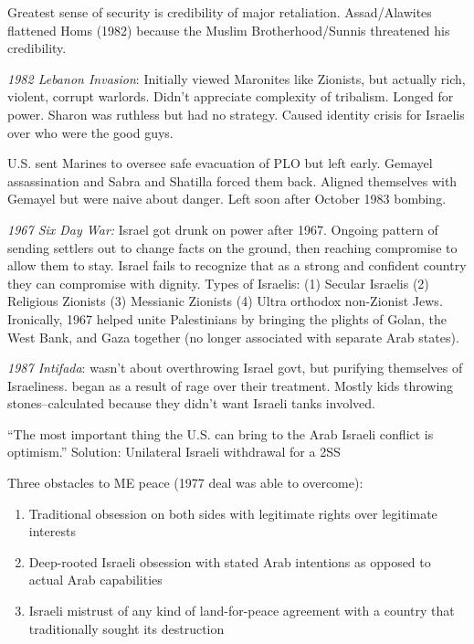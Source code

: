 \documentclass[
]{article}
\begin{document}
Greatest sense of security is credibility of major retaliation.
Assad/Alawites flattened Homs (1982) because the Muslim
Brotherhood/Sunnis threatened his credibility.

\emph{1982 Lebanon Invasion}: Initially viewed Maronites like Zionists,
but actually rich, violent, corrupt warlords. Didn't appreciate
complexity of tribalism. Longed for power. Sharon was ruthless but had
no strategy. Caused identity crisis for Israelis over who were the good
guys.

U.S. sent Marines to oversee safe evacuation of PLO but left early.
Gemayel assassination and Sabra and Shatilla forced them back. Aligned
themselves with Gemayel but were naive about danger. Left soon after
October 1983 bombing.

\emph{1967 Six Day War:} Israel got drunk on power after 1967. Ongoing
pattern of sending settlers out to change facts on the ground, then
reaching compromise to allow them to stay. Israel fails to recognize
that as a strong and confident country they can compromise with dignity.
Types of Israelis: (1) Secular Israelis (2) Religious Zionists (3)
Messianic Zionists (4) Ultra orthodox non-Zionist Jews. Ironically, 1967
helped unite Palestinians by bringing the plights of Golan, the West
Bank, and Gaza together (no longer associated with separate Arab
states).

\emph{1987 Intifada}: wasn't about overthrowing Israel govt, but
purifying themselves of Israeliness. began as a result of rage over
their treatment. Mostly kids throwing stones--calculated because they
didn't want Israeli tanks involved.

``The most important thing the U.S. can bring to the Arab Israeli
conflict is optimism.'' Solution: Unilateral Israeli withdrawal for a
2SS

Three obstacles to ME peace (1977 deal was able to overcome):

\begin{enumerate}
\def\labelenumi{\arabic{enumi}.}
\item
  Traditional obsession on both sides with legitimate rights over
  legitimate interests
\item
  Deep-rooted Israeli obsession with stated Arab intentions as opposed
  to actual Arab capabilities
\item
  Israeli mistrust of any kind of land-for-peace agreement with a
  country that traditionally sought its destruction
\end{enumerate}
\end{document}
